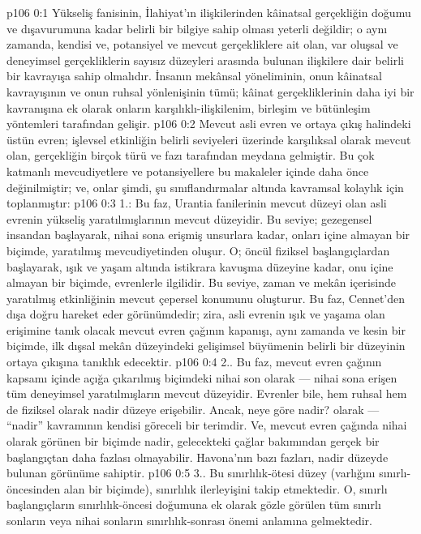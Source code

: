\vs p106 0:1 Yükseliş fanisinin, İlahiyat’ın ilişkilerinden kâinatsal gerçekliğin doğumu ve dışavurumuna kadar belirli bir bilgiye sahip olması yeterli değildir; o aynı zamanda, kendisi ve, potansiyel ve mevcut gerçekliklere ait olan, var oluşsal ve deneyimsel gerçekliklerin sayısız düzeyleri arasında bulunan ilişkilere dair belirli bir kavrayışa sahip olmalıdır. İnsanın mekânsal yöneliminin, onun kâinatsal kavrayışının ve onun ruhsal yönlenişinin tümü; kâinat gerçekliklerinin daha iyi bir kavranışına ek olarak onların karşılıklı\hyp{}ilişkilenim, birleşim ve bütünleşim yöntemleri tarafından gelişir.
\vs p106 0:2 Mevcut asli evren ve ortaya çıkış halindeki üstün evren; işlevsel etkinliğin belirli seviyeleri üzerinde karşılıksal olarak mevcut olan, gerçekliğin birçok türü ve fazı tarafından meydana gelmiştir. Bu çok katmanlı mevcudiyetlere ve potansiyellere bu makaleler içinde daha önce değinilmiştir; ve, onlar şimdi, şu sınıflandırmalar altında kavramsal kolaylık için toplanmıştır:
\vs p106 0:3 1.\bibnobreakspace {}: Bu faz, Urantia fanilerinin mevcut düzeyi olan asli evrenin yükseliş yaratılmışlarının mevcut düzeyidir. Bu seviye; gezegensel insandan başlayarak, nihai sona erişmiş unsurlara kadar, onları içine almayan bir biçimde, yaratılmış mevcudiyetinden oluşur. O; öncül fiziksel başlangıçlardan başlayarak, ışık ve yaşam altında istikrara kavuşma düzeyine kadar, onu içine almayan bir biçimde, evrenlerle ilgilidir. Bu seviye, zaman ve mekân içerisinde yaratılmış etkinliğinin mevcut çepersel konumunu oluşturur. Bu faz, Cennet’den dışa doğru hareket eder görünümdedir; zira, asli evrenin ışık ve yaşama olan erişimine tanık olacak mevcut evren çağının kapanışı, aynı zamanda ve kesin bir biçimde, ilk dışsal mekân düzeyindeki gelişimsel büyümenin belirli bir düzeyinin ortaya çıkışına tanıklık edecektir.
\vs p106 0:4 2.\bibnobreakspace {}. Bu faz, mevcut evren çağının kapsamı içinde açığa çıkarılmış biçimdeki nihai son olarak --- nihai sona erişen tüm deneyimsel yaratılmışların mevcut düzeyidir. Evrenler bile, hem ruhsal hem de fiziksel olarak nadir düzeye erişebilir. Ancak, neye göre nadir? olarak --- “nadir” kavramının kendisi göreceli bir terimdir. Ve, mevcut evren çağında nihai olarak görünen bir biçimde nadir, gelecekteki çağlar bakımından gerçek bir başlangıçtan daha fazlası olmayabilir. Havona’nın bazı fazları, nadir düzeyde bulunan görünüme sahiptir.
\vs p106 0:5 3.\bibnobreakspace {}. Bu sınırlılık\hyp{}ötesi düzey (varlığını sınırlı\hyp{}öncesinden alan bir biçimde), sınırlılık ilerleyişini takip etmektedir. O, sınırlı başlangıçların sınırlılık\hyp{}öncesi doğumuna ek olarak gözle görülen tüm sınırlı sonların veya nihai sonların sınırlılık\hyp{}sonrası önemi anlamına gelmektedir.
